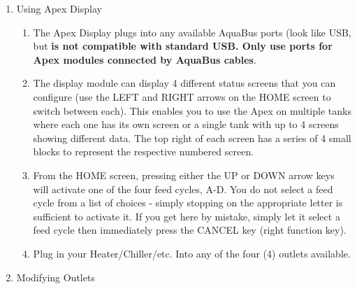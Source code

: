 \documentclass[
]{book}
\providecommand{\tightlist}{%
  \setlength{\itemsep}{0pt}\setlength{\parskip}{0pt}}
\begin{document}
\begin{enumerate}
\def\labelenumi{\arabic{enumi}.}
\tightlist
\item
  Using Apex Display

  \begin{enumerate}
  \def\labelenumii{\arabic{enumii}.}
  \tightlist
  \item
    The Apex Display plugs into any available AquaBus ports (look like USB, but \textbf{is not compatible with standard USB. Only use ports for Apex modules connected by AquaBus cables}.\\
  \item
    The display module can display 4 different status screens that you can configure (use the LEFT and RIGHT arrows on the HOME screen to switch between each). This enables you to use the Apex on multiple tanks where each one has its own screen or a single tank with up to 4 screens showing different data. The top right of each screen has a series of 4 small blocks to represent the respective numbered screen.\\
  \item
    From the HOME screen, pressing either the UP or DOWN arrow keys will activate one of the four feed cycles, A-D. You do not select a feed cycle from a list of choices - simply stopping on the appropriate letter is sufficient to activate it. If you get here by mistake, simply let it select a feed cycle then immediately press the CANCEL key (right function key).\\
  \item
    Plug in your Heater/Chiller/etc. Into any of the four (4) outlets available.\\
  \end{enumerate}
\item
  Modifying Outlets


\end{enumerate}
\end{document}
